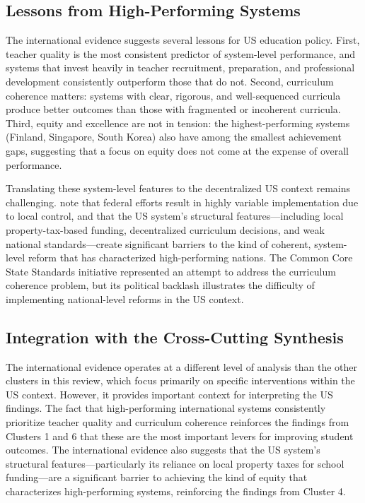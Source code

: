 \documentclass[12pt,letterpaper]{article}
\begin{document}
\subsection{Lessons from High-Performing Systems}

The international evidence suggests several lessons for US education policy. First, teacher quality is the most consistent predictor of system-level performance, and systems that invest heavily in teacher recruitment, preparation, and professional development consistently outperform those that do not. Second, curriculum coherence matters: systems with clear, rigorous, and well-sequenced curricula produce better outcomes than those with fragmented or incoherent curricula. Third, equity and excellence are not in tension: the highest-performing systems (Finland, Singapore, South Korea) also have among the smallest achievement gaps, suggesting that a focus on equity does not come at the expense of overall performance.

Translating these system-level features to the decentralized US context remains challenging. \citet{porter2022} note that federal efforts result in highly variable implementation due to local control, and that the US system's structural features---including local property-tax-based funding, decentralized curriculum decisions, and weak national standards---create significant barriers to the kind of coherent, system-level reform that has characterized high-performing nations. The Common Core State Standards initiative represented an attempt to address the curriculum coherence problem, but its political backlash illustrates the difficulty of implementing national-level reforms in the US context.

\subsection{Integration with the Cross-Cutting Synthesis}

The international evidence operates at a different level of analysis than the other clusters in this review, which focus primarily on specific interventions within the US context. However, it provides important context for interpreting the US findings. The fact that high-performing international systems consistently prioritize teacher quality and curriculum coherence reinforces the findings from Clusters 1 and 6 that these are the most important levers for improving student outcomes. The international evidence also suggests that the US system's structural features---particularly its reliance on local property taxes for school funding---are a significant barrier to achieving the kind of equity that characterizes high-performing systems, reinforcing the findings from Cluster 4.
\end{document}
